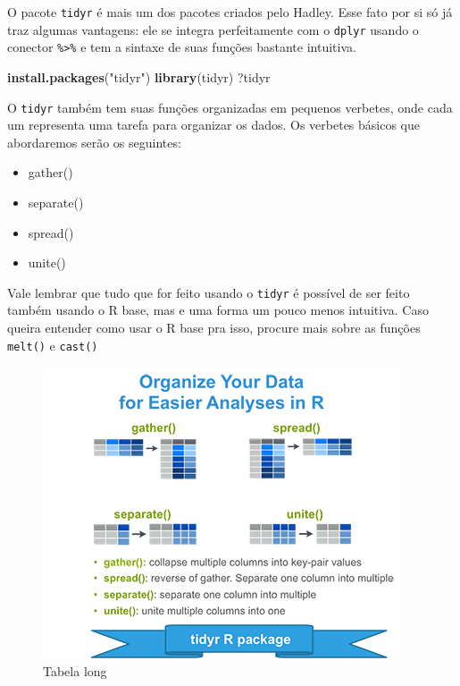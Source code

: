 \documentclass[]{book}
\newenvironment{Shaded}{\begin{snugshade}}{\end{snugshade}}
\newcommand{\KeywordTok}[1]{\textcolor[rgb]{0.13,0.29,0.53}{\textbf{#1}}}
\newcommand{\StringTok}[1]{\textcolor[rgb]{0.31,0.60,0.02}{#1}}
\newcommand{\NormalTok}[1]{#1}
\providecommand{\tightlist}{%
  \setlength{\itemsep}{0pt}\setlength{\parskip}{0pt}}
\begin{document}
O pacote \texttt{tidyr} é mais um dos pacotes criados pelo Hadley. Esse
fato por si só já traz algumas vantagens: ele se integra perfeitamente
com o \texttt{dplyr} usando o conector \texttt{\%\textgreater{}\%} e tem
a sintaxe de suas funções bastante intuitiva.

\begin{Shaded}
\begin{Highlighting}[]
\KeywordTok{install.packages}\NormalTok{(}\StringTok{"tidyr"}\NormalTok{)}
\KeywordTok{library}\NormalTok{(tidyr)}
\NormalTok{?tidyr}
\end{Highlighting}
\end{Shaded}

O \texttt{tidyr} também tem suas funções organizadas em pequenos
verbetes, onde cada um representa uma tarefa para organizar os dados. Os
verbetes básicos que abordaremos serão os seguintes:

\begin{itemize}
\tightlist
\item
  gather()
\item
  separate()
\item
  spread()
\item
  unite()
\end{itemize}

Vale lembrar que tudo que for feito usando o \texttt{tidyr} é possível
de ser feito também usando o R base, mas e uma forma um pouco menos
intuitiva. Caso queira entender como usar o R base pra isso, procure
mais sobre as funções \texttt{melt()} e \texttt{cast()}

\begin{figure}

{\centering \includegraphics[width=1\linewidth]{imagens/tidyr} 

}

\caption{Tabela long}\label{fig:unnamed-chunk-79}
\end{figure}
\end{document}
